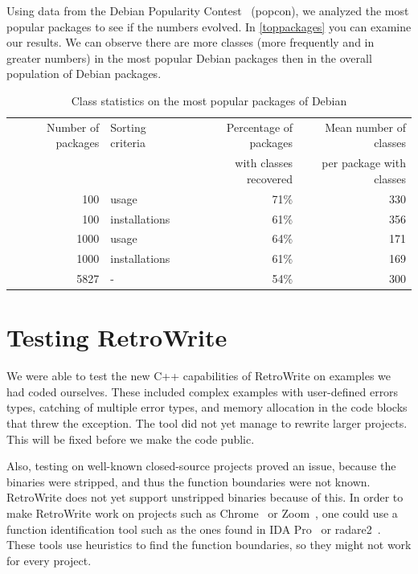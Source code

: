 \documentclass[a4paper,11pt,oneside]{report}
\begin{document}
Using data from the Debian Popularity Contest~\cite{popcon} (popcon), we
analyzed the most popular packages to see if the numbers evolved.
In \autoref{toppackages} you can examine our results.
We can observe there are more classes (more frequently and in greater numbers)
in the most popular Debian packages then in the overall population of Debian
packages.

\begin{table}[h]
  \centering
  {\small
  \begin{tabular}{r | l | r | r}
    Number of packages & Sorting criteria & Percentage of packages & Mean 
    number of classes \\
    & & with classes recovered & per package with classes \\
    \hline
    100 & usage & 71\% & 330 \\
    100 & installations & 61\% & 356 \\
    1000 & usage & 64\% & 171 \\
    1000 & installations & 61\% & 169 \\
    5827 & - & 54\% & 300
  \end{tabular}
  }

\caption{Class statistics on the most popular packages of Debian}
\label{toppackages}

\end{table}


\section{Testing RetroWrite}

We were able to test the new C++ capabilities of RetroWrite on examples we had
coded ourselves.
These included complex examples with user-defined errors types, catching of
multiple error types, and memory allocation in the code blocks that threw the
exception.
The tool did not yet manage to rewrite larger projects.
This will be fixed before we make the code public.

Also, testing on well-known closed-source projects proved an issue, because
the binaries were stripped, and thus the function boundaries were not known.
RetroWrite does not yet support unstripped binaries because of this.
In order to make RetroWrite work on projects such as Chrome~\cite{chrome} or
Zoom~\cite{zoom}, one could use a function identification tool such as the
ones found in IDA Pro~\cite{ida} or radare2~\cite{radare}.
These tools use heuristics to find the function boundaries, so they might not
work for every project.
\end{document}

